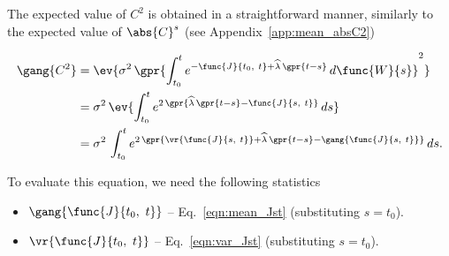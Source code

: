 The expected value of $C^2$ is obtained in a straightforward manner, similarly to the expected value of $\abs{C}^s$ (see Appendix~\ref{app:mean_absC2})

\begin{align}
    \gang{C^2} &= \ev{\sigma^2\,\gpr{\int_{t_0}^{t} e^{-\func{J}{t_0,\ t} + \widehat{\lambda}\,\gpr{t - s}}\,d\func{W}{s}}^2} \nonumber \\
    	&= \sigma^2\,\ev{\int_{t_0}^{t} e^{2\,\gpr{\widehat{\lambda}\,\gpr{t - s} - \func{J}{s,\ t}}}\,ds} \nonumber \\
    	&= \sigma^2\,\int_{t_0}^{t} e^{2\,\gpr{\vr{\func{J}{s,\ t}} + \widehat{\lambda}\,\gpr{t - s} - \gang{\func{J}{s,\ t}}}}\,ds. \label{eqn:mean_C2}
\end{align}

To evaluate this equation, we need the following statistics

\begin{itemize}
	\item [] $\gang{\func{J}{t_0,\ t}}$ -- Eq.~\ref{eqn:mean_Jst} (substituting $s = t_0$).
	\item [] $\vr{\func{J}{t_0,\ t}}$ -- Eq.~\ref{eqn:var_Jst} (substituting $s = t_0$).
\end{itemize}

